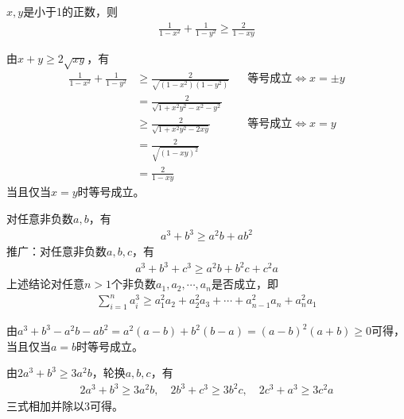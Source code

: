 \begin{example}
  $x,y$是小于1的正数，则
  \begin{align*}
    \frac1{1-x^2} + \frac1{1-y^2} \ge \frac2{1-xy}
  \end{align*}
\end{example}
由$x+y\ge2\sqrt{xy}$，有
\begin{align*}
  \frac1{1-x^2} + \frac1{1-y^2} &\ge \frac2{\sqrt{(1-x^2)(1-y^2)}} &&\text{等号成立}\iff x=\pm y\\
  &=\frac2{\sqrt{1+x^2y^2-x^2-y^2}} \\
  &\ge \frac2{\sqrt{1+x^2y^2-2xy}} &&\text{等号成立}\iff x=y\\
  &=\frac2{\sqrt{(1-xy)^2}} \\
  &=\frac2{1-xy}
\end{align*}
当且仅当$x=y$时等号成立。

\begin{example}
  对任意非负数$a,b$，有
  \begin{align*}
    a^3+b^3\ge a^2b+ab^2
  \end{align*}
  推广：对任意非负数$a,b,c$，有
  \begin{align*}
    a^3+b^3+c^3\ge a^2b+b^2c+c^2a
  \end{align*}
  上述结论对任意$n>1$个非负数$a_1,a_2,\cdots,a_n$是否成立，即
  \begin{align*}
    \sum_{i=1}^n a_i^3\ge a_1^2a_2 + a_2^2a_3 + \cdots + a_{n-1}^2a_n + a_n^2a_1
  \end{align*}
\end{example}
由$a^3+b^3-a^2b-ab^2=a^2(a-b)+b^2(b-a)=(a-b)^2(a+b)\ge0$可得，当且仅当$a=b$时等号成立。

由$2a^3+b^3\ge3a^2b$，轮换$a,b,c$，有
\begin{align*}
  2a^3+b^3\ge3a^2b,\quad 2b^3+c^3\ge3b^2c,\quad 2c^3+a^3\ge3c^2a
\end{align*}
三式相加并除以3可得。

